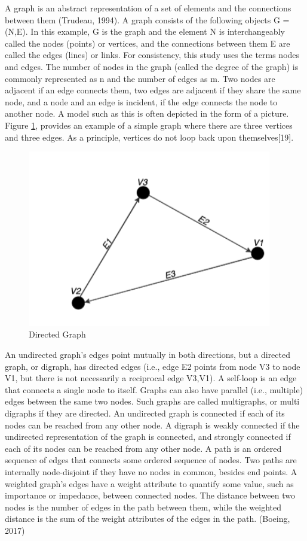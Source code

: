 A graph is an abstract representation of a set of elements and the connections between them (Trudeau, 1994). A graph consists of the following objects G = (N,E). In this example, G is the graph and the element N is interchangeably called the nodes (points) or vertices, and the connections between them E are called the edges (lines) or links. For consistency, this study uses the terms nodes and edges. The number of nodes in the graph (called the degree of the graph) is commonly represented as n and the number of edges as m. Two nodes are adjacent if an edge connects them, two edges are adjacent if they share the same node, and a node and an edge is incident, if the edge connects the node to another node. A model such as this is often depicted in the form of a picture. Figure \ref{fig:directedgraph}, provides an example of a simple graph where there are three vertices and three edges. As a principle, vertices do not loop back upon themselves[19]. 

\begin{figure}[h]
\centering
\includegraphics[width=0.95\textwidth,center]{picture/figure5.png}
\caption[Directed Graph]{Directed Graph}
\label{fig:directedgraph}
\end{figure}

An undirected graph's edges point mutually in both directions, but a directed graph, or digraph, has directed edges (i.e., edge E2 points from node V3 to node V1, but there is not necessarily a reciprocal edge V3,V1). A self-loop is an edge that connects a single node to itself. Graphs can also have parallel (i.e., multiple) edges between the same two nodes. Such graphs are called multigraphs, or multi digraphs if they are directed. An undirected graph is connected if each of its nodes can be reached from any other node. A digraph is weakly connected if the undirected representation of the graph is connected, and strongly connected if each of its nodes can be reached from any other node. A path is an ordered sequence of edges that connects some ordered sequence of nodes. Two paths are internally node-disjoint if they have no nodes in common, besides end points. A weighted graph's edges have a weight attribute to quantify some value, such as importance or impedance, between connected nodes. The distance between two nodes is the number of edges in the path between them, while the weighted distance is the sum of the weight attributes of the edges in the path. (Boeing, 2017)

